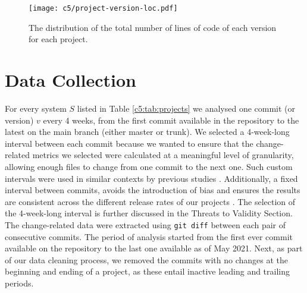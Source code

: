 \begin{figure}
    \centering
    \texttt{[image: c5/project-version-loc.pdf]}
    \caption{The distribution of the total number of lines of code of each version for each project.} \label{c5:fig:projects-versions-loc}
\end{figure}


\section{Data Collection}\label{c5:sec:data-collection}
For every system $S$ listed in Table \ref{c5:tab:projects} we analysed one commit (or version) $v$ every 4 weeks, from the first commit available in the repository to the latest on the main branch (either master or trunk).
We selected a 4-week-long interval between each commit because we wanted to ensure that the change-related metrics we selected were calculated at a meaningful level of granularity, allowing enough files to change from one commit to the next one.
Such custom intervals were used in similar contexts by previous studies \cite{Nagappan2007,Kouroshfar2015,Arcelli2019b}.
Additionally, a fixed interval between commits, avoids the introduction of bias and ensures the results are consistent across the different release rates of our projects \cite{Kouroshfar2015}. The selection of the 4-week-long interval is further discussed in the Threats to Validity Section.
The change-related data were extracted using \texttt{git diff} between each pair of consecutive commits.
The period of analysis started from the first ever commit available on the repository to the last one available as of May 2021. Next, as part of our data cleaning process, we removed the commits with no changes at the beginning and ending of a project, as these entail inactive leading and trailing periods.


